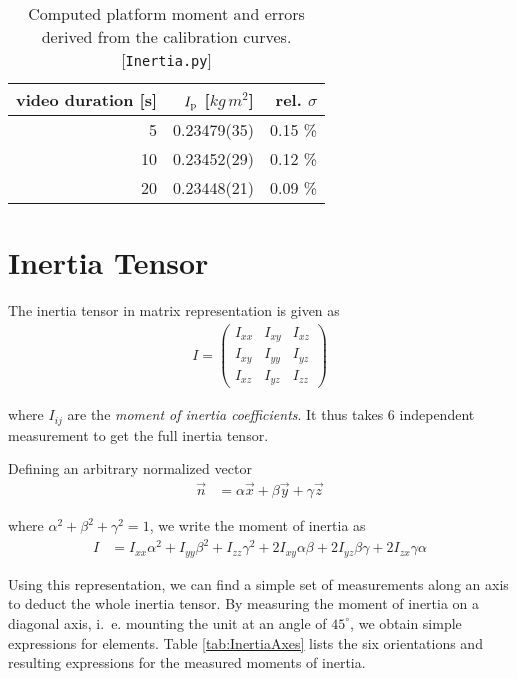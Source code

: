 \documentclass[journal]{IEEEtran}
\begin{document}
\begin{table}
	\centering
	\begin{tabular}[h]{r | r  r}
		video duration [s] & $I_{\textup{p}}$ [$\unit{kg\,m^2}$] & rel. $\sigma$ \\
		\hline
		5	& 0.23479(35)	& 0.15 \% \\
		10	& 0.23452(29)	& 0.12 \% \\
		20	& 0.23448(21)	& 0.09 \% \\
	\end{tabular}
	\caption{Computed platform moment and errors derived from the calibration curves. [\texttt{Inertia.py}]}
	\label{tab:Inertia}
\end{table}

\section{Inertia Tensor}

The inertia tensor in matrix representation is given as
\begin{align}
	I = 
	\begin{pmatrix}
		I_{xx} & I_{xy} & I_{xz} \\
		I_{xy} & I_{yy} & I_{yz} \\
		I_{xz} & I_{yz} & I_{zz}
	\end{pmatrix}
\end{align}

where $I_{ij}$ are the \emph{moment of inertia coefficients}.
It thus takes 6 independent measurement to get the full inertia tensor.

Defining an arbitrary normalized vector
\begin{align}
	\vec{n} & = \alpha \vec{x} + \beta \vec{y} + \gamma \vec{z}
\end{align}

where $\alpha^2 + \beta^2 + \gamma^2 = 1$, we write the moment of inertia as \cite{book:goldstein}
\begin{align}
	I & = I_{xx} \alpha^2 + I_{yy} \beta^2 + I_{zz} \gamma^2 + 2 I_{xy} \alpha \beta + 2 I_{yz} \beta \gamma + 2 I_{zx} \gamma \alpha
\end{align}

Using this representation, we can find a simple set of measurements along an axis to deduct the whole inertia tensor.
By measuring the moment of inertia on a diagonal axis, i.~e. mounting the unit at an angle of $45^{\circ}$, we obtain simple expressions for elements.
Table \ref{tab:InertiaAxes} lists the six orientations and resulting expressions for the measured moments of inertia.
\end{document}

